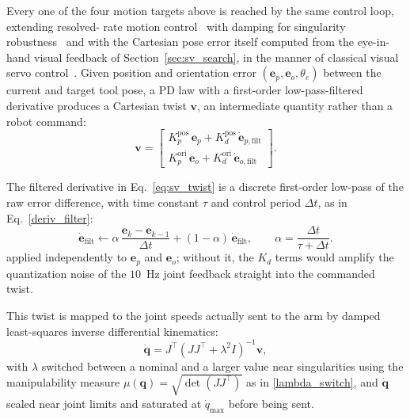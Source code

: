 Every one of the four motion targets above is reached by the same control loop, extending resolved-
rate motion control~\citep{whitney1969resolved} with damping for singularity
robustness~\citep{wampler1986manipulator,chiaverini1994review,nakamura1986inverse} and with the
Cartesian pose error itself computed from the eye-in-hand visual feedback of
Section~\ref{sec:sv_search}, in the manner of classical visual servo
control~\citep{hutchinson1996tutorial}. Given position and orientation error
$(\mathbf{e}_p, \mathbf{e}_o, \theta_e)$ between the current and target tool pose, a PD law with a
first-order low-pass-filtered derivative produces a Cartesian twist $\mathbf{v}$, an intermediate
quantity rather than a robot command:
\begin{equation}
\mathbf{v} =
\begin{bmatrix}
K_p^{\text{pos}}\,\mathbf{e}_p + K_d^{\text{pos}}\,\dot{\mathbf{e}}_{p,\text{filt}} \\
K_p^{\text{ori}}\,\mathbf{e}_o + K_d^{\text{ori}}\,\dot{\mathbf{e}}_{o,\text{filt}}
\end{bmatrix}.
\label{eq:sv_twist}
\end{equation}

The filtered derivative in Eq.~\ref{eq:sv_twist} is a discrete first-order low-pass of the raw error difference, with time constant $\tau$ and control period $\Delta t$, as in Eq.~\ref{deriv_filter}:
\begin{equation}
\dot{\mathbf{e}}_{\mathrm{filt}}
\leftarrow
\alpha\,\frac{\mathbf{e}_{k}-\mathbf{e}_{k-1}}{\Delta t}
+
(1-\alpha)\,\dot{\mathbf{e}}_{\mathrm{filt}},
\qquad
\alpha=\frac{\Delta t}{\tau+\Delta t}.
\label{deriv_filter}
\end{equation}
applied independently to $\mathbf e_p$ and $\mathbf e_o$; without it, the $K_d$ terms would amplify the quantization noise of the $10$~Hz joint feedback straight into the commanded twist.


This twist is mapped to the joint speeds actually sent to the arm by damped least-squares inverse
differential kinematics:
\begin{equation}
\dot{\mathbf{q}} = J^\top \left( J J^\top + \lambda^2 I \right)^{-1} \mathbf{v},
\label{eq:sv_dls}
\end{equation}
with $\lambda$ switched between a nominal and a larger value near singularities using the
manipulability measure $\mu(\mathbf{q}) = \sqrt{\det(J J^\top)}$ as in \ref{lambda_switch}, and $\dot{\mathbf{q}}$ scaled near
joint limits and saturated at $\dot{q}_{\max}$ before being sent.

